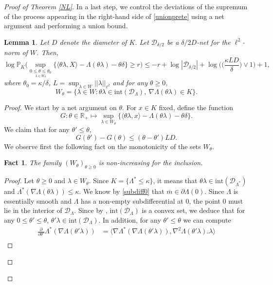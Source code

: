 \documentclass[aop,preprint]{imsart}
\newcommand\RR{\mathbb{R}}
\newcommand\PP{\mathbb{P}}
\numberwithin{equation}{section}
\theoremstyle{definition}
\theoremstyle{plain}
\newtheorem{lemma}[Def]{Lemma}
\newtheorem{fact}[Def]{Fact}
\theoremstyle{remark}
\begin{document}
\begin{proof}[Proof of Theorem \ref{NL}]
In a last step, we control the deviations of the supremum of the process appearing in the right-hand side of \eqref{unionprete} using a net argument and performing a union bound. 
\begin{lemma}\label{netargument}  Let $D$ denote the diameter of  $K$. Let $\mathcal{D}_{\delta/2}$ be a $\delta/2D$-net for the $\ell^2$-norm of $W$. Then, 
$$\log  \PP_K\big( \sup_{ \underset{\lambda \in  W_{\theta}}{0 \leq \theta \leq \theta_0}}  \{ \langle \theta \lambda , X\rangle  - \Lambda(\theta\lambda) - \theta \delta\} \geq r\big) \leq -r +\log |\mathcal{D}_{\delta/2}| + \log\Big( \Big(\frac{\kappa LD}{\delta}\Big)\vee 1\Big)+1,$$
where $\theta_0 = \kappa/\delta$, $ L = \sup_{ \lambda \in W} ||\lambda ||_{\ell^2}$ and for any $\theta\geq 0$,
$$W_{\theta} = \big\{ \lambda \in W : \theta \lambda \in \mathrm{int}(\mathcal{D}_\Lambda), \  \nabla\Lambda(\theta \lambda)  \in K\big\}.$$
\end{lemma} 
\begin{proof}
 We start by a net argument on $\theta$. 
 For $x\in K$ fixed, define the function 
$$G : \theta \in \RR_+  \mapsto \sup_{\lambda \in W_{\theta}} \{ \langle \theta\lambda, x\rangle - \Lambda(\theta \lambda) - \theta \delta\}.$$
We claim that for any $\theta' \leq \theta$,
\begin{equation} \label{liponeside} G(\theta') - G(\theta) \leq (\theta -\theta')LD.\end{equation}
We observe first the following fact on the monotonicity of the sets $W_\theta$.
\begin{fact}\label{monotonicity}
The family $(W_{\theta})_{\theta \geq 0}$ is non-increasing for the inclusion.
\end{fact}
\begin{proof}
 Let $ \theta\geq 0$ and $\lambda \in W_\theta$. Since $K= \{ \Lambda^* \leq \kappa\}$, it means that $\theta \lambda\in\mathrm{int}(\mathcal{D}_{\Lambda^*})$ and $\Lambda^*(\nabla \Lambda(\theta \lambda ))\leq \kappa$. We know by \eqref{subdiff0} that $\overline{m} \in  \partial \Lambda(0)$. Since $\Lambda$ is essentially smooth and $\Lambda$ has a non-empty subdifferential at $0$, the point $0$ must lie in the interior of $\mathcal{D}_\Lambda$. Since by \cite[Theorem 6.2]{Rockafeller}, $\mathrm{int}(\mathcal{D}_\Lambda)$ is a convex set, we deduce that for any $0\leq \theta '\leq \theta $, $\theta' \lambda \in \mathrm{int}(\mathcal{D}_\Lambda)$.  In addition, for any $\theta' \leq \theta$ we can compute
\begin{align*}
\frac{\partial}{\partial \theta'}\Lambda^*(\nabla \Lambda(\theta' \lambda)) &= \langle \nabla \Lambda^*(\nabla \Lambda(\theta' \lambda)), \nabla^2\Lambda(\theta' \lambda). \lambda \rangle \\

\end{align*}
\end{proof}
\end{proof}
\end{proof}
\end{document}
